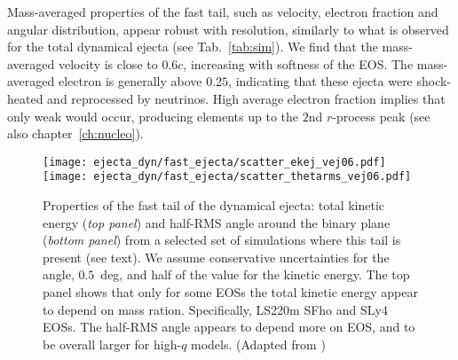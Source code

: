 Mass-averaged properties of the fast tail, such as velocity, electron fraction and 
angular distribution, appear robust with resolution, similarly to what is observed for 
the total dynamical ejecta (see Tab.~\ref{tab:sim}).
%
We find that the mass-averaged velocity %
is close to $0.6c$,
increasing with softness of the \ac{EOS}.
%
The mass-averaged electron
is generally above $0.25$, 
indicating that these ejecta were shock-heated and reprocessed by neutrinos. High 
average electron fraction implies that only weak \rproc{} \nuc{} would 
occur, producing elements up to the $2$nd $r$-process peak \citep{Lippuner:2015gwa} 
(see also chapter~\ref{ch:nucleo}).


\begin{figure}%
    \centering 
    \texttt{[image: ejecta\_dyn/fast\_ejecta/scatter\_ekej\_vej06.pdf]}
    \texttt{[image: ejecta\_dyn/fast\_ejecta/scatter\_thetarms\_vej06.pdf]}
    \caption{
        Properties of the fast tail of the dynamical ejecta:
        total kinetic energy (\textit{top panel}) and 
        half-\ac{RMS} angle around the binary plane (\textit{bottom panel})
        from a selected set of simulations where this tail is present (see text).
        We assume conservative uncertainties for the angle, $0.5$~deg, 
        and half of the value for the kinetic energy. 
        The top panel shows that only for some \acp{EOS} the 
        total kinetic energy appear to depend on mass ration. Specifically, LS220m SFho and SLy4 \acp{EOS}.
        The half-\ac{RMS} angle appears to depend more on \ac{EOS}, and to be overall larger for high-$q$ models.
        (Adapted from \citet{Nedora:2021eoj})
    } 
    \label{fig:ejecta_v06}
\end{figure}



